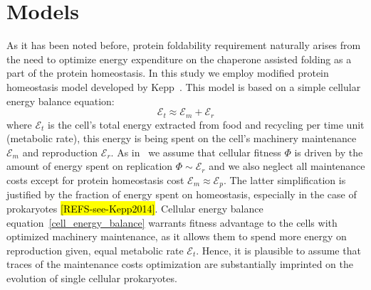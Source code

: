 \documentclass[10pt,letterpaper]{article}
\begin{document}
\section*{Models}
As it has been noted before, protein foldability requirement naturally arises from the need to optimize energy expenditure on the chaperone assisted folding as a part of the protein homeostasis. In this study we employ modified protein homeostasis model developed by Kepp~\cite{Kepp2014Model}. This model is based on a simple cellular energy balance equation:
\begin{equation}
	\label{cell_energy_balance}
	\mathcal{E}_{t} \approx \mathcal{E}_{m} + \mathcal{E}_{r}
\end{equation}
where $\mathcal{E}_{t}$ is the cell's total energy extracted from food and recycling per time unit (metabolic rate), this energy is being spent on the cell's machinery maintenance $\mathcal{E}_{m}$ and reproduction $\mathcal{E}_{r}$. As in~\cite{Kepp2014Model} we assume that cellular fitness $\Phi$ is driven by the amount of energy spent on replication $\Phi \sim \mathcal{E}_{r}$ and we also neglect all maintenance costs except for protein homeostasis cost $\mathcal{E}_{m}\approx\mathcal{E}_{p}$. The latter simplification is justified by the fraction of energy spent on homeostasis, especially in the case of prokaryotes \hl{[REFS-see-Kepp2014]}. Cellular energy balance equation~\eqref{cell_energy_balance} warrants fitness advantage to the cells with optimized machinery maintenance, as it allows them to spend more energy on reproduction given, equal metabolic rate $\mathcal{E}_{t}$. Hence, it is plausible to assume that traces of the maintenance costs optimization are substantially imprinted on the evolution of single cellular prokaryotes.
\end{document}
